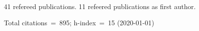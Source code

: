 41 refereed publications. 11 refeered publications as first author.

Total citations~=~895; h-index~=~15 (2020-01-01)